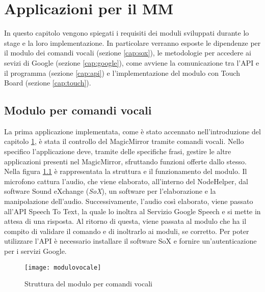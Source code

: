 \chapter{Applicazioni per il MM}\label{capitolo4}
In questo capitolo vengono spiegati i requisiti dei moduli sviluppati durante lo stage e la loro implementazione.
In particolare verranno esposte le dipendenze per il modulo dei comandi vocali (sezione \ref{cap:sox}), le metodologie
per accedere ai sevizi di Google (sezione \ref{cap:google}), come avviene la comunicazione tra l'API e il programma (sezione \ref{cap:api})
e l'implementazione del modulo con Touch Board (sezione \ref{cap:touch}).

\section{Modulo per comandi vocali}\label{cap:voce}
La prima applicazione implementata, come \`e stato accennato nell'introduzione del capitolo \ref{capitolo4}, \`e
stata il controllo del MagicMirror tramite comandi vocali.
Nello specifico l'applicazione deve, tramite delle specifiche frasi,
gestire le altre applicazioni presenti nel MagicMirror, sfruttando funzioni offerte dallo stesso.\\
Nella figura \ref{fig:modulovocale} \`e rappresentata la struttura e il funzionamento del modulo.
Il microfono cattura l'audio, che viene elaborato, all'interno del NodeHelper, dal software Sound eXchange (\textit{SoX}), un software per l'elaborazione e la manipolazione
dell'audio. Successivamente, l'audio così elaborato, viene
passato all'API Speech To Text, la quale lo inoltra al Servizio Google Speech e si mette in attesa di una risposta.
Al ritorno di questa, viene passata al modulo che ha il compito di validare il comando e di inoltrarlo ai moduli, se
corretto.
Per poter utilizzare l'API \`e necessario installare il software SoX e fornire un'autenticazione per i servizi Google.

\begin{figure}[H]
    \texttt{[image: modulovocale]}
    \caption{Struttura del modulo per comandi vocali}
    \label{fig:modulovocale}
\end{figure}

